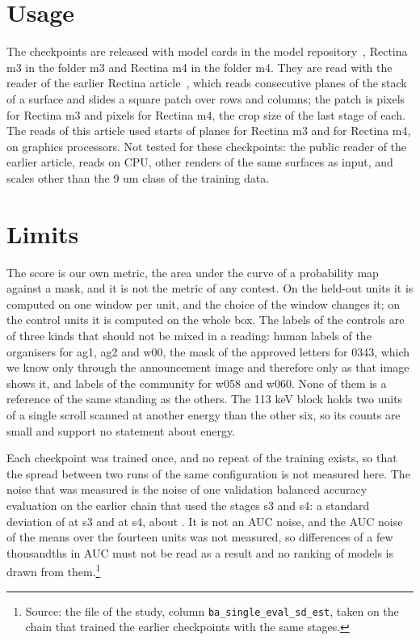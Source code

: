 



\section{Usage}\label{sec:usage}

The checkpoints are released with model cards in the model repository~\cite{hfrepo}, Rectina m3 in the folder m3 and Rectina m4 in the folder m4. They are read with the reader of the earlier Rectina article~\cite{rectinaone}, which reads \Planes{} consecutive planes of the stack of a surface and slides a square patch over rows and columns; the patch is \PxSOne{} pixels for Rectina m3 and \PxSFour{} pixels for Rectina m4, the crop size of the last stage of each. The reads of this article used \ReadStarts{} starts of \Planes{} planes for Rectina m3 and \ReadStartsFour{} for Rectina m4, on graphics processors. Not tested for these checkpoints: the public reader of the earlier article, reads on CPU, other renders of the same surfaces as input, and scales other than the 9 um class of the training data.

\section{Limits}

The score is our own metric, the area under the curve of a probability map against a mask, and it is not the metric
of any contest. On the held-out units it is computed on one window per unit, and the choice of the window changes
it; on the control units it is computed on the whole box. The labels of the controls are of three kinds that should
not be mixed in a reading: human labels of the organisers for ag1, ag2 and w00, the mask of the approved letters for
0343, which we know only through the announcement image and therefore only as that image shows it, and labels of the
community for w058 and w060. None of them is a reference of the same standing as the others. The 113 keV block holds
two units of a single scroll scanned at another energy than the other six, so its counts are small and support no
statement about energy.

Each checkpoint was trained once, and no repeat of the training exists, so that the spread between
two runs of the same configuration is not measured here. The noise that was measured is the noise of one validation balanced accuracy evaluation on the earlier chain that used the stages s3 and s4: a standard deviation of \NoiseThree{} at s3 and \NoiseFour{} at s4, about \NoiseAbout{}. It is not an AUC noise, and the AUC noise of the means over the fourteen units was not measured, so differences of a few thousandths in AUC must not be read as a result and no ranking of models is drawn from them.\footnote{Source: the file  of the study, column \texttt{ba\_single\_eval\_sd\_est}, taken on the chain that trained the earlier checkpoints with the same stages.}

